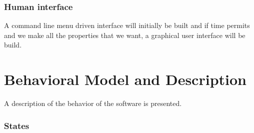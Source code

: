 \documentclass{article}
\begin{document}


\subsubsection{Human interface}
A command line menu driven interface will initially be built and if time permits and we make all the properties that we want, a graphical user interface will be build.


\section{Behavioral Model and Description}
A description of the behavior of the software is presented.



\subsubsection{States}
\end{document}
